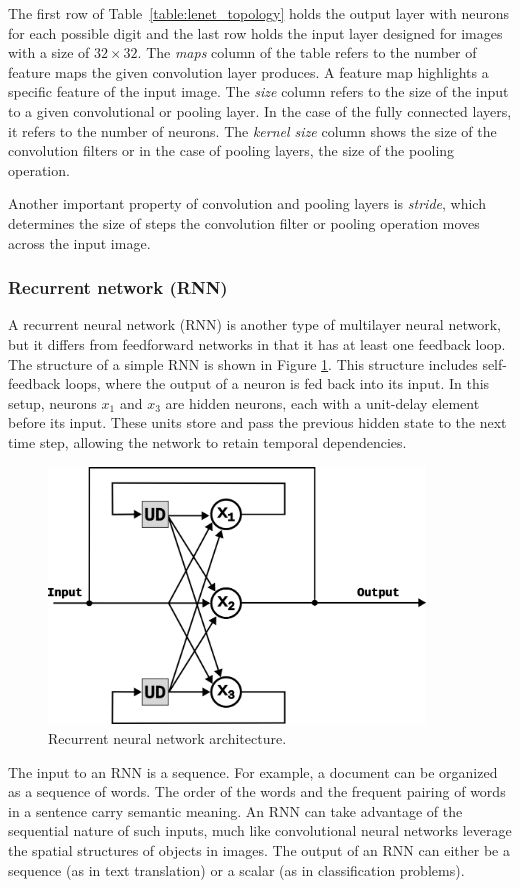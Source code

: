 \documentclass[a4paper,oneside,onecolumn,12pt]{book}
\begin{document}
		The first row of Table~\ref{table:lenet_topology} holds the output layer with neurons for each possible digit and the last row holds the input layer designed for images with a size of $32 \times 32$. The \textit{maps} column of the table refers to the number of feature maps the given convolution layer produces. A feature map highlights a specific feature of the input image. The \textit{size} column refers to the size of the input to a given convolutional or pooling layer. In the case of the fully connected layers, it refers to the number of neurons. The \textit{kernel size} column shows the size of the convolution filters or in the case of pooling layers, the size of the pooling operation. \cite{HMLSKT} 
		
		Another important property of convolution and pooling layers is \textit{stride}, which determines the size of steps the convolution filter or pooling operation moves across the input image.

		\subsubsection{Recurrent network (RNN)}
		A recurrent neural network (RNN) is another type of multilayer neural network, but it differs from feedforward networks in that it has at least one feedback loop. The structure of a simple RNN is shown in Figure \ref{fig:rnn}. This structure includes self-feedback loops, where the output of a neuron is fed back into its input. In this setup, neurons $x_1$ and $x_3$ are hidden neurons, each with a unit-delay element before its input. These units store and pass the previous hidden state to the next time step, allowing the network to retain temporal dependencies. \cite{NNACF}
		\begin{figure}[H]
		\begin{center}
			\includegraphics[keepaspectratio,width=10cm]{kep/rnn.png}
			\caption{Recurrent neural network architecture.}
			\label{fig:rnn}
		\end{center}
		\end{figure}
		The input to an RNN is a sequence. For example, a document can be organized as a sequence of words. The order of the words and the frequent pairing of words in a sentence carry semantic meaning. An RNN can take advantage of the sequential nature of such inputs, much like convolutional neural networks leverage the spatial structures of objects in images. The output of an RNN can either be a sequence (as in text translation) or a scalar (as in classification problems). \cite{AISL}
\end{document}
